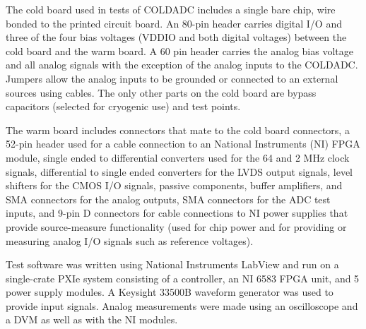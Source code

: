 The cold board used in tests of COLDADC includes a single bare chip, wire bonded to the printed circuit board.  An 80-pin header carries digital I/O and three of the four bias voltages (VDDIO and both digital voltages) between the cold board and the warm board.  A 60 pin header carries the analog bias voltage and all analog signals with the exception of the analog inputs to the COLDADC.  Jumpers allow the analog inputs to be grounded or connected to an external sources using cables.  The only other parts on the cold board are bypass capacitors (selected for cryogenic use) and test points.

The warm board includes connectors that mate to the cold board connectors, a 52-pin header used for a cable connection to an National Instruments (NI) FPGA module, single ended to differential converters used for the 64 and 2 MHz clock signals, differential to single ended converters for the LVDS output signals, level shifters for the CMOS I/O signals, passive components, buffer amplifiers, and SMA connectors for the analog outputs, SMA connectors for the ADC test inputs, and 9-pin D connectors for cable connections to NI power supplies that provide source-measure functionality (used for chip power and for providing or measuring analog I/O signals such as reference voltages).

Test software was written using National Instruments LabView and run on a single-crate PXIe system consisting of a controller, an NI 6583 FPGA unit, and 5 power supply modules.  A Keysight 33500B waveform generator was used to provide input signals.  Analog measurements were made using an oscilloscope and a DVM as well as with the NI modules.

